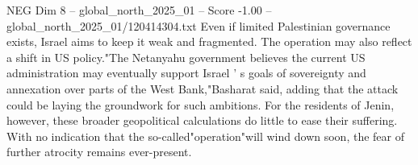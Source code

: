 \begin{textsample}{NEG Dim 8 – global\_north\_2025\_01 – Score -1.00 – global\_north\_2025\_01/120414304.txt}
Even if limited Palestinian governance exists, Israel aims to keep it weak and fragmented.
The operation may also reflect a shift in US policy."The Netanyahu government believes the current US administration may eventually support Israel ' s goals of sovereignty and annexation over parts of the West Bank,"Basharat said, adding that the attack could be laying the groundwork for such ambitions.
For the residents of Jenin, however, these broader geopolitical calculations do little to ease their suffering.
With no indication that the so-called"operation"will wind down soon, the fear of further atrocity remains ever-present.

\end{textsample}
